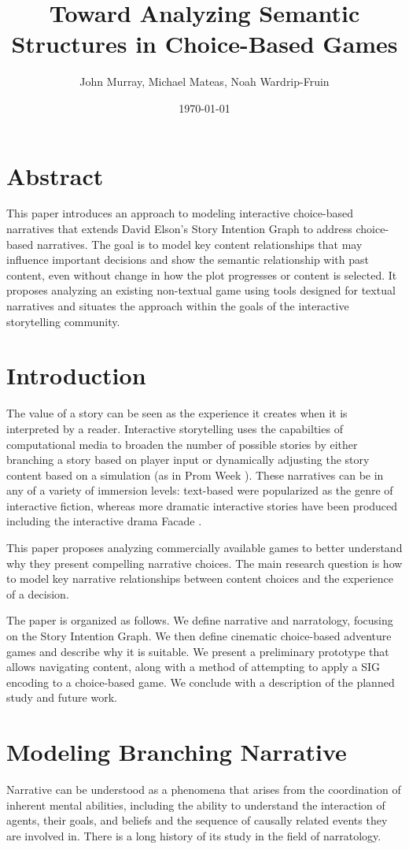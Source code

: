 \documentclass[10pt]{article}
\author{John Murray, Michael Mateas, Noah Wardrip-Fruin}
\date{\today}
\title{Toward Analyzing Semantic Structures in Choice-Based Games}
\begin{document}
\maketitle
\section{Abstract}
\label{sec:orgheadline1}
This paper introduces an approach to modeling interactive choice-based
narratives that extends David Elson's Story Intention Graph to address
choice-based narratives. The goal is to model key content
relationships that may influence important decisions and show the
semantic relationship with past content, even without change in how
the plot progresses or content is selected. It proposes analyzing an
existing non-textual game using tools designed for textual narratives
and situates the approach within the goals of the interactive
storytelling community.
\section{Introduction}
\label{sec:orgheadline2}
The value of a story can be seen as the experience it creates when it
is interpreted by a reader. Interactive storytelling uses the
capabilties of computational media to broaden the number of possible
stories by either branching a story based on player input or
dynamically adjusting the story content based on a simulation (as in
Prom Week \cite{McCoy2013}). These narratives can be in any of a
variety of immersion levels: text-based were popularized as the genre
of interactive fiction, whereas more dramatic interactive stories have
been produced including the interactive drama Facade
\cite{Mateas2005}. 

This paper proposes analyzing commercially available games to better
understand why they present compelling narrative choices. The main
research question is how to model key narrative relationships between
content choices and the experience of a decision.

The paper is organized as follows. We define narrative and
narratology, focusing on the Story Intention Graph. We then define
cinematic choice-based adventure games and describe why it is
suitable. We present a preliminary prototype that allows navigating
content, along with a method of attempting to apply a SIG encoding to
a choice-based game. We conclude with a description of the planned
study and future work.

\section{Modeling Branching Narrative}
\label{sec:orgheadline3}
Narrative can be understood as a phenomena that arises from the
coordination of inherent mental abilities, including the ability to
understand the interaction of agents, their goals, and beliefs and the
sequence of causally related events they are involved in. There is a
long history of its study in the field of narratology. 
\end{document}
